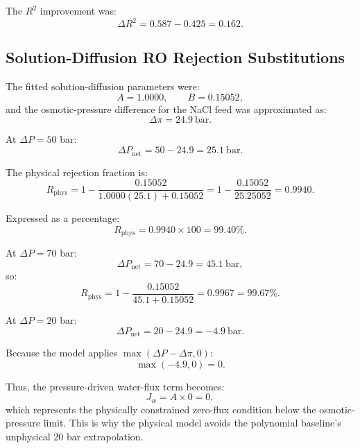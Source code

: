 The $R^2$ improvement was:
\begin{equation}
\Delta R^2 =
0.587 - 0.425
=
0.162.
\end{equation}

\subsection{Solution-Diffusion RO Rejection Substitutions}
The fitted solution-diffusion parameters were:
\begin{equation}
A=1.0000, \qquad B=0.15052,
\end{equation}
and the osmotic-pressure difference for the NaCl feed was approximated as:
\begin{equation}
\Delta \pi = 24.9 \ \mathrm{bar}.
\end{equation}

At $\Delta P=50$ bar:
\begin{equation}
\Delta P_{\mathrm{net}}
=
50-24.9
=
25.1 \ \mathrm{bar}.
\end{equation}

The physical rejection fraction is:
\begin{equation}
R_{\mathrm{phys}}
=
1-\frac{0.15052}{1.0000(25.1)+0.15052}
=
1-\frac{0.15052}{25.25052}
=
0.9940.
\end{equation}

Expressed as a percentage:
\begin{equation}
R_{\mathrm{phys}} = 0.9940 \times 100 = 99.40\%.
\end{equation}

At $\Delta P=70$ bar:
\begin{equation}
\Delta P_{\mathrm{net}}
=
70-24.9
=
45.1 \ \mathrm{bar},
\end{equation}
so:
\begin{equation}
R_{\mathrm{phys}}
=
1-\frac{0.15052}{45.1+0.15052}
=
0.9967
=
99.67\%.
\end{equation}

At $\Delta P=20$ bar:
\begin{equation}
\Delta P_{\mathrm{net}}
=
20-24.9
=
-4.9 \ \mathrm{bar}.
\end{equation}

Because the model applies $\max(\Delta P-\Delta \pi,0)$:
\begin{equation}
\max(-4.9,0)=0.
\end{equation}

Thus, the pressure-driven water-flux term becomes:
\begin{equation}
J_w = A \times 0 = 0,
\end{equation}
which represents the physically constrained zero-flux condition below the osmotic-pressure limit. This is why the physical model avoids the polynomial baseline's unphysical 20 bar extrapolation.

